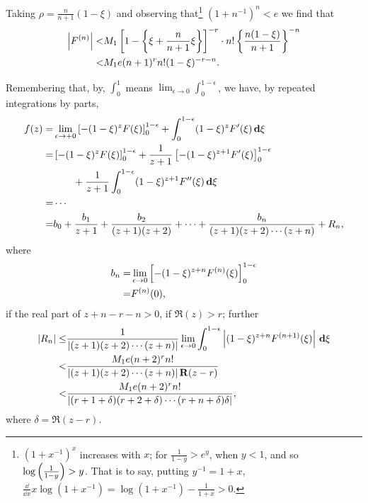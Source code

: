 Taking $\rho = \frac{n}{n+1} (1-\xi)$ and observing
that\footnote{ $(1 + x^{-1})^{x}$ increases with $x$;
  for $\frac{1}{1-y} > e^{y}$, when $y < 1$, and so
  $\log \left( \frac{1}{1-y} \right) > y$. That is to
  say, putting $y^{-1} = 1+x$,
  $
  \frac{\dd}{\dd x} x \log (1 + x^{-1})
  =
  \log (1 + x^{-1})
  -
  \frac{1}{1+x}
  >
  0
  $.
}
$(1 + n^{-1})^{n} < e$
we find that
\begin{align*}
  \left| F^{(n)} \right|
  <&
  M_{1}
  \left[ 
    1
    -
    \left\{ 
      \xi
      +
      \frac{n}{n+1} \xi
     \right\}
   \right]^{-r}
  \cdot
  n!
  \left\{ 
    \frac{n (1-\xi)}{n+1}
   \right\}^{-n}
  \\
  <&
  M_{1} e (n+1)^{r} n! (1-\xi)^{-r-n}.
\end{align*}

Remembering that, by, $\int_{0}^{1}$ means
$\lim_{\epsilon \rightarrow 0} \int_{0}^{1-\epsilon}$, we
have, by repeated integrations by parts,
\begin{align*}
  f(z)
  =&
  \lim_{\epsilon \rightarrow +0}
  \left[ 
    -(1 - \xi)^{z} F(\xi)
   \right]_{0}^{1-\epsilon}
  +
  \int_{0}^{1 - \epsilon}
  (1 - \xi)^{z} F'(\xi) \, \mathbf{d} \xi
  \\
  =&
  \left[ 
    -(1 - \xi)^{z} F(\xi)
   \right]_{0}^{1 - \epsilon}
  +
  \frac{1}{z + 1}
  \left[ 
    -(1 - \xi)^{z+1} F'(\xi)
   \right]_{0}^{1 - \epsilon}
  \\
  &
  \quad
  \quad
  +
  \frac{1}{z + 1}
  \int_{0}^{1 - \epsilon}
  (1 - \xi)^{z+1} F''(\xi) \, \mathbf{d} \xi
  \\
  =&
  \cdots
  \\
  =&
  b_{0}
  +
  \frac{b_{1}}{z+1}
  +
  \frac{b_{2}}{(z+1)(z+2)}
  +
  \cdots
  +
  \frac{b_{n}}{(z+1)(z+2)\cdots(z+n)}
  +
  R_{n},
\end{align*}
where
\begin{align*}
  b_{n}
  =&
  \lim_{\epsilon \rightarrow 0}
  \left[ 
    -(1-\xi)^{z+n} F^{(n)}(\xi)
   \right]_{0}^{1 - \epsilon}
  \\
  =&
  F^{(n)}(0),
\end{align*}
if the real part of $z+n-r-n>0$, \ie if $\Re(z) > r$;
further
\begin{align*}
  \left| R_{n} \right|
  \leq &
  \frac{1}{ \left|  (z+1)(z+2)\cdots(z+n)   \right|}
  \lim_{\epsilon \rightarrow 0}
  \int_{0}^{1 - \epsilon}
  \left|  (1-\xi)^{z+n} F^{(n+1)}(\xi)  \right|
  \, \mathbf{d} \xi
  \\
  <&
  \frac{ M_{1} e (n+2)^{r} n!}{
    \left| (z+1)(z+2)\cdots(z+n) \right| \operatorname{\mathbf{R}}(z-r)}
  \\
  <&
  \frac{ M_{1} e (n+2)^{r} n!}{
    \left|  (r+1+\delta)(r+2+\delta) \cdots (r+n+\delta) \delta  \right|
    },
\end{align*}
where $\delta = \Re(z - r)$.
%
%

